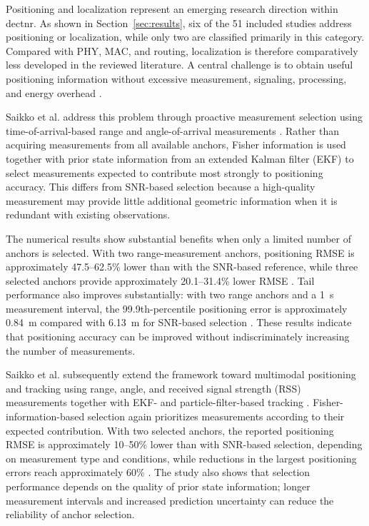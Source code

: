 Positioning and localization represent an emerging research direction within
\gls{dectnr}. As shown in Section~\ref{sec:results}, six of the 51 included studies address positioning or localization, while only two are classified primarily in this category. Compared with PHY, MAC, and routing, localization is therefore comparatively less developed in the reviewed literature. A central challenge is to obtain useful positioning information without excessive measurement, signaling, processing, and energy overhead \cite{saikkoPositioningDECT2020NR2024, saikkoPositioningTrackingDECT20202025}.

Saikko et al. address this problem through proactive measurement selection using time-of-arrival-based range and angle-of-arrival measurements \cite{saikkoPositioningDECT2020NR2024}. Rather than acquiring measurements from all available anchors, Fisher information is used together with prior state information from an extended Kalman filter (EKF) to select measurements expected to contribute most strongly to positioning accuracy. This differs from SNR-based selection because a high-quality measurement may provide little additional geometric information when it is redundant with existing observations.

The numerical results show substantial benefits when only a limited number of anchors is selected. With two range-measurement anchors, positioning RMSE is approximately 47.5--62.5\% lower than with the SNR-based reference, while three selected anchors provide approximately 20.1--31.4\% lower RMSE \cite{saikkoPositioningDECT2020NR2024}. Tail performance also improves substantially: with two range anchors and a 1~s measurement interval, the 99.9th-percentile positioning error is approximately 0.84~m compared with 6.13~m for SNR-based selection \cite{saikkoPositioningDECT2020NR2024}. These results indicate that positioning accuracy can be improved without indiscriminately increasing the number of measurements.

Saikko et al. subsequently extend the framework toward multimodal positioning and tracking using range, angle, and received signal strength (RSS) measurements together with EKF- and particle-filter-based tracking \cite{saikkoPositioningTrackingDECT20202025}. Fisher-information-based selection again prioritizes measurements according to their expected contribution. With two selected anchors, the reported positioning RMSE is approximately 10--50\% lower than with SNR-based selection, depending on measurement type and conditions, while reductions in the largest positioning errors reach approximately 60\% \cite{saikkoPositioningTrackingDECT20202025}. The study also shows that selection performance depends on the quality of prior state information; longer measurement intervals and increased prediction uncertainty can reduce the reliability of anchor selection.

